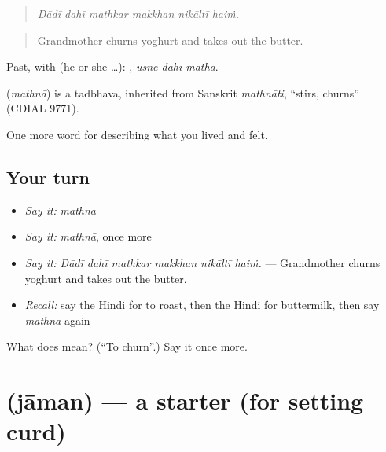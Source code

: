 \begin{quote}
     
\end{quote}

\begin{quote}
\emph{Dādī dahī mathkar makkhan nikāltī haiṁ.}
\end{quote}

\begin{quote}
Grandmother churns yoghurt and takes out the butter.
\end{quote}

Past, with  (he or she …):   , \emph{usne dahī mathā}.

\begin{cousinweb}
\textbf{} (\emph{mathnā}) is a tadbhava, inherited from Sanskrit \emph{mathnāti}, \textquotedblleft{}stirs, churns\textquotedblright{} (CDIAL 9771).
\end{cousinweb}

\begin{grammarlens}[title={What you've built}]
One more word for describing what you lived and felt.
\end{grammarlens}

\subsection*{Your turn}
\begin{itemize}
\raggedright
  \item \emph{Say it:} \emph{mathnā}
  \item \emph{Say it:} \emph{mathnā}, once more
  \item \emph{Say it:} \emph{Dādī dahī mathkar makkhan nikāltī haiṁ.} — Grandmother churns yoghurt and takes out the butter.
  \item \emph{Recall:} say the Hindi for to roast, then the Hindi for buttermilk, then say \emph{mathnā} again
\end{itemize}

\begin{tcolorbox}[breakable,colback=teal!4,colframe=teal!35!black,title={Before you move on}]
What does  mean? (\textquotedblleft{}To churn\textquotedblright{}.) Say it once more.
\end{tcolorbox}
\section[\texorpdfstring{\hi{जामन} (jāman)}{जामन (jāman)}]{ (jāman) — a starter (for setting curd)}

